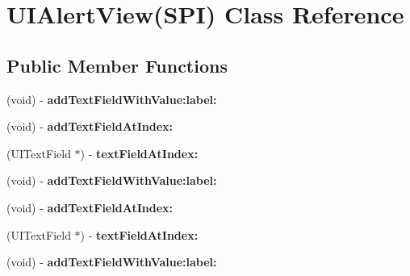 \hypertarget{interface_u_i_alert_view_07_s_p_i_08}{
\section{\-U\-I\-Alert\-View(\-S\-P\-I) \-Class \-Reference}
\label{interface_u_i_alert_view_07_s_p_i_08}
}
\subsection*{\-Public \-Member \-Functions}
\begin{DoxyCompactItemize}
\item 
\hypertarget{interface_u_i_alert_view_07_s_p_i_08_aabdddf6c4e54d664cfecb2d6452de586}{
(void) -\/ {\bfseries add\-Text\-Field\-With\-Value\-:label\-:}}
\label{interface_u_i_alert_view_07_s_p_i_08_aabdddf6c4e54d664cfecb2d6452de586}

\item 
\hypertarget{interface_u_i_alert_view_07_s_p_i_08_a221998f1c3f48e8cb6b39368d26561f8}{
(void) -\/ {\bfseries add\-Text\-Field\-At\-Index\-:}}
\label{interface_u_i_alert_view_07_s_p_i_08_a221998f1c3f48e8cb6b39368d26561f8}

\item 
\hypertarget{interface_u_i_alert_view_07_s_p_i_08_a0c4f860784b97fa2cd5509fbd8f1fe63}{
(\-U\-I\-Text\-Field $\ast$) -\/ {\bfseries text\-Field\-At\-Index\-:}}
\label{interface_u_i_alert_view_07_s_p_i_08_a0c4f860784b97fa2cd5509fbd8f1fe63}

\item 
\hypertarget{interface_u_i_alert_view_07_s_p_i_08_aabdddf6c4e54d664cfecb2d6452de586}{
(void) -\/ {\bfseries add\-Text\-Field\-With\-Value\-:label\-:}}
\label{interface_u_i_alert_view_07_s_p_i_08_aabdddf6c4e54d664cfecb2d6452de586}

\item 
\hypertarget{interface_u_i_alert_view_07_s_p_i_08_a221998f1c3f48e8cb6b39368d26561f8}{
(void) -\/ {\bfseries add\-Text\-Field\-At\-Index\-:}}
\label{interface_u_i_alert_view_07_s_p_i_08_a221998f1c3f48e8cb6b39368d26561f8}

\item 
\hypertarget{interface_u_i_alert_view_07_s_p_i_08_a0c4f860784b97fa2cd5509fbd8f1fe63}{
(\-U\-I\-Text\-Field $\ast$) -\/ {\bfseries text\-Field\-At\-Index\-:}}
\label{interface_u_i_alert_view_07_s_p_i_08_a0c4f860784b97fa2cd5509fbd8f1fe63}

\item 
\hypertarget{interface_u_i_alert_view_07_s_p_i_08_aabdddf6c4e54d664cfecb2d6452de586}{
(void) -\/ {\bfseries add\-Text\-Field\-With\-Value\-:label\-:}}
\label{interface_u_i_alert_view_07_s_p_i_08_aabdddf6c4e54d664cfecb2d6452de586}


\end{DoxyCompactItemize}

